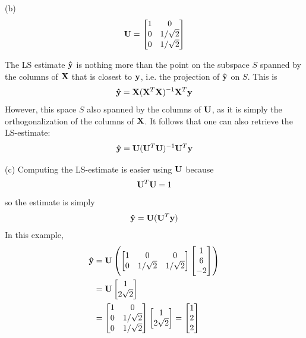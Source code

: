 \documentclass[a4paper, 12pt]{article}
\begin{document}
\begin{solution}
    (b)
    \[
        \mathbf{U} = \begin{bmatrix}
            1 & 0          \\
            0 & 1/\sqrt{2} \\
            0 & 1/\sqrt{2}
        \end{bmatrix}
    \]

    The LS estimate $\mathbf{\hat{y}}$ is nothing more than the point on the subspace $S$ spanned by the columns of $\mathbf{X}$ that is closest to $\mathbf{y}$, i.e. the projection of $\mathbf{\hat{y}}$ on $S$. This is \[
        \mathbf{\hat{y}} = \mathbf{X}(\mathbf{X}^T \mathbf{X})^{-1} \mathbf{X}^T \mathbf{y}
    \]
    However, this space $S$ also spanned by the columns of $\mathbf{U}$, as it is simply the orthogonalization of the columns of $\mathbf{X}$. It follows that one can also retrieve the LS-estimate:\[
        \mathbf{\hat{y}} = \mathbf{U}(\mathbf{U}^T \mathbf{U})^{-1} \mathbf{U}^T \mathbf{y}
    \]

    (c) Computing the LS-estimate is easier using $\mathbf{U}$ because \[
        \mathbf{U}^T \mathbf{U} = 1
    \]
    so the estimate is simply \[
        \mathbf{\hat{y}} = \mathbf{U}(\mathbf{U}^T \mathbf{y})
    \]
    In this example, \begin{align*}
        \mathbf{\hat{y}} & = \mathbf{U} \left(\begin{bmatrix}
                                   1 & 0          & 0          \\
                                   0 & 1/\sqrt{2} & 1/\sqrt{2}
                               \end{bmatrix} \begin{bmatrix}
                                                 1 \\ 6 \\ -2
                                             \end{bmatrix}\right) \\
                & = \mathbf{U} \begin{bmatrix}
                             1 \\
                             2\sqrt{2}
                         \end{bmatrix}                           \\
                & = \begin{bmatrix}
                        1 & 0          \\
                        0 & 1/\sqrt{2} \\
                        0 & 1/\sqrt{2}
                    \end{bmatrix} \begin{bmatrix}
                                      1 \\
                                      2\sqrt{2}
                                  \end{bmatrix} = \begin{bmatrix}
                                                      1 \\
                                                      2 \\
                                                      2
                                                  \end{bmatrix}
    \end{align*}
\end{solution}
\end{document}
